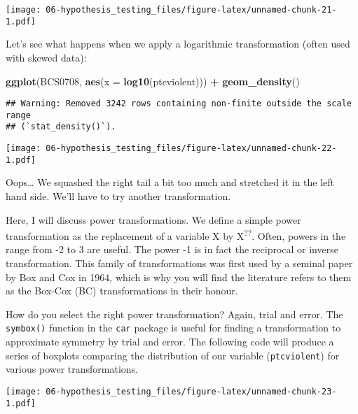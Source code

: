 \documentclass[
]{book}
\newenvironment{Shaded}{\begin{snugshade}}{\end{snugshade}}
\newcommand{\AttributeTok}[1]{\textcolor[rgb]{0.13,0.29,0.53}{#1}}
\newcommand{\FunctionTok}[1]{\textcolor[rgb]{0.13,0.29,0.53}{\textbf{#1}}}
\newcommand{\NormalTok}[1]{#1}
\newcommand{\SpecialCharTok}[1]{\textcolor[rgb]{0.81,0.36,0.00}{\textbf{#1}}}
\begin{document}
\texttt{[image: 06-hypothesis\_testing\_files/figure-latex/unnamed-chunk-21-1.pdf]}

Let's see what happens when we apply a logarithmic transformation (often used with skewed data):

\begin{Shaded}
\begin{Highlighting}[]
\FunctionTok{ggplot}\NormalTok{(BCS0708, }\FunctionTok{aes}\NormalTok{(}\AttributeTok{x =} \FunctionTok{log10}\NormalTok{(ptcviolent))) }\SpecialCharTok{+} 
  \FunctionTok{geom\_density}\NormalTok{()}
\end{Highlighting}
\end{Shaded}

\begin{verbatim}
## Warning: Removed 3242 rows containing non-finite outside the scale range
## (`stat_density()`).
\end{verbatim}

\texttt{[image: 06-hypothesis\_testing\_files/figure-latex/unnamed-chunk-22-1.pdf]}

Oops\ldots{} We squashed the right tail a bit too much and stretched it in the left hand side. We'll have to try another transformation.

Here, I will discuss power transformations. We define a simple power transformation as the replacement of a variable X by X\textsuperscript{??}. Often, powers in the range from -2 to 3 are useful. The power -1 is in fact the reciprocal or inverse transformation. This family of transformations was first used by a seminal paper by Box and Cox in 1964, which is why you will find the literature refers to them as the Box-Cox (BC) transformations in their honour.

How do you select the right power transformation? Again, trial and error. The \texttt{symbox()} function in the \texttt{car} package is useful for finding a transformation to approximate symmetry by trial and error. The following code will produce a series of boxplots comparing the distribution of our variable (\texttt{ptcviolent}) for various power transformations.

\begin{Shaded}
\end{Shaded}

\texttt{[image: 06-hypothesis\_testing\_files/figure-latex/unnamed-chunk-23-1.pdf]}
\end{document}
